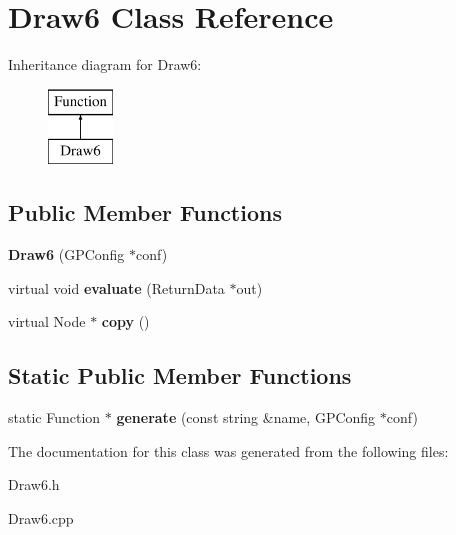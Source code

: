 \hypertarget{class_draw6}{\section{Draw6 Class Reference}
\label{class_draw6}
}
Inheritance diagram for Draw6\-:\begin{figure}[H]
\begin{center}
\leavevmode
\includegraphics[height=2.000000cm]{class_draw6}
\end{center}
\end{figure}
\subsection*{Public Member Functions}
\begin{DoxyCompactItemize}
\item 
\hypertarget{class_draw6_a3ce8484795df7bd08600ee8a7d457852}{{\bfseries Draw6} (G\-P\-Config $\ast$conf)}\label{class_draw6_a3ce8484795df7bd08600ee8a7d457852}

\item 
\hypertarget{class_draw6_afc1c9a9b88e1857dc72e9d92abe7a701}{virtual void {\bfseries evaluate} (Return\-Data $\ast$out)}\label{class_draw6_afc1c9a9b88e1857dc72e9d92abe7a701}

\item 
\hypertarget{class_draw6_a005e2fba5cbe94cf402f242a05e86cd2}{virtual Node $\ast$ {\bfseries copy} ()}\label{class_draw6_a005e2fba5cbe94cf402f242a05e86cd2}

\end{DoxyCompactItemize}
\subsection*{Static Public Member Functions}
\begin{DoxyCompactItemize}
\item 
\hypertarget{class_draw6_afc0f21375d2221fc5b558e7144e3e59d}{static Function $\ast$ {\bfseries generate} (const string \&name, G\-P\-Config $\ast$conf)}\label{class_draw6_afc0f21375d2221fc5b558e7144e3e59d}

\end{DoxyCompactItemize}


The documentation for this class was generated from the following files\-:\begin{DoxyCompactItemize}
\item 
Draw6.\-h\item 
Draw6.\-cpp\end{DoxyCompactItemize}
